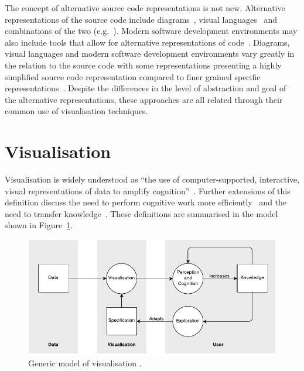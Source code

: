 The concept of alternative source code representations is not new. Alternative representations of the source code include diagrams~\cite{Rumbaugh2004}, visual languages~\cite{Cox2007} and combinations of the two (e.g.~\cite{Lucanin2011}). Modern software development environments may also include tools that allow for alternative representations of code~\cite{Cox2007}. Diagrams, visual languages and modern software development environments vary greatly in the relation to the source code with some representations presenting a highly simplified source code representation compared to finer grained specific representations~. Despite the differences in the level of abstraction and goal of the alternative representations, these approaches are all related through their common use of visualisation techniques.

\section{Visualisation}

Visualisation is widely understood as ``the use of computer-supported, interactive, visual representations of data to amplify cognition''~\cite{Card1999}. Further extensions of this definition discuss the need to perform cognitive work more efficiently~\cite{Ware2013a} and the need to transfer knowledge~\cite{Burkhard}. These definitions are summarised in the model shown in Figure~\ref{fig:model-of-visualisation}.

\begin{figure}
  \centering \includegraphics[width=\columnwidth]{../images/diagrams/wijk-model-of-visualisation.pdf}
  \caption{Generic model of visualisation \protect\cite{VanWijk2005}.}
\label{fig:model-of-visualisation}
\end{figure} 


